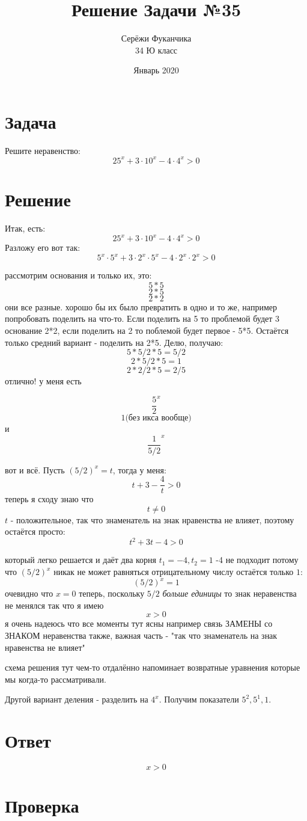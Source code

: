 \documentclass{article}
\title{Решение Задачи №35}
\author{Серёжи Фуканчика\\34 Ю класс}
\date{Январь 2020}
\begin{document}
\maketitle

\section{Задача}
Решите неравенство:
$$25^x+3\cdot{}10^x-4\cdot{}4^x>0$$

\section{Решение}
Итак, есть:
$$25^x+3\cdot{}10^x-4\cdot{}4^x>0$$
Разложу его вот так:
$$5^x\cdot{}5^{x}+3\cdot{}2^x\cdot{}5^x-4\cdot{}2^x\cdot{}2^x>0$$

рассмотрим основания и только их, это:
$$5*5$$
$$2*5$$
$$2*2$$
они все разные. хорошо бы их было превратить в одно и то же, например попробовать поделить на что-то. Если поделить на 5 то проблемой будет 3 основание 2*2, если поделить на 2 то поблемой будет первое - 5*5. Остаётся только средний вариант - поделить на 2*5. Делю, получаю:
$$5*5/2*5=5/2$$
$$2*5/2*5=1$$
$$2*2/2*5=2/5$$
отлично! у меня есть
\begin{samepage}
$$\frac{5}{2}^x$$
$$1 \textrm{(без икса вообще)}$$
и
$$\frac{1}{5/2}^x$$
\end{samepage}
вот и всё. Пусть $(5/2)^x=t$, тогда у меня:
$$t+3-\frac{4}{t}>0$$
теперь я сходу знаю что
$$t\ne{}0$$
$t$ - положительное, так что знаменатель на знак нравенства не влияет, поэтому остаётся просто:
$$t^2+3t-4>0$$

который легко решается и даёт два корня
$t_1=-4, t_2=1$ -4 не подходит потому что $(5/2)^x$ никак не может равняться отрицательному числу остаётся только $1$:
$$(5/2)^x=1$$
очевидно что $x=0$ теперь, поскольку $5/2$ \textit{больше единицы} то знак неравенства не менялся так что я имею
$$x>0$$
я очень надеюсь что все моменты тут ясны
например связь ЗАМЕНЫ со ЗНАКОМ неравенства
также, важная часть - "так что знаменатель на знак нравенства не влияет"

схема решения тут чем-то отдалённо напоминает возвратные уравнения которые мы когда-то рассматривали.

Другой вариант деления - разделить на $4^x$. Получим показатели $5^2, 5^1, 1$.

\section{Ответ}
$$x>0$$

\section{Проверка}
\end{document}
